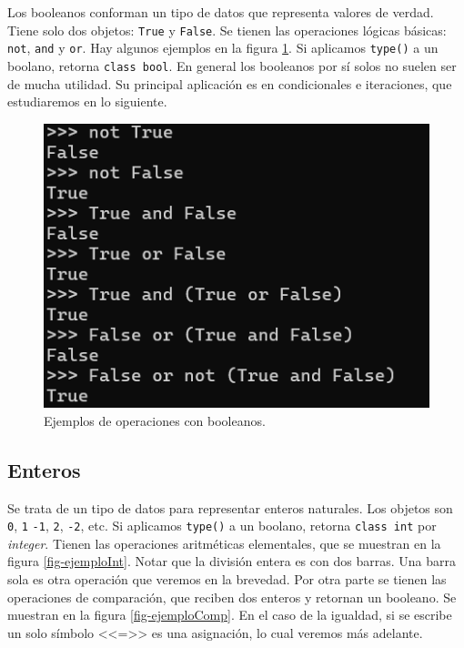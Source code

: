 \documentclass[a4paper, 12pt]{report}
\theoremstyle{definition}
\begin{document}
Los booleanos conforman un tipo de datos que representa valores de verdad. Tiene solo dos objetos: {\tt True} y {\tt False}. Se tienen las operaciones lógicas básicas: {\tt not}, {\tt and} y {\tt or}. Hay algunos ejemplos en la figura \ref{fig-ejemploBool}. Si aplicamos {\tt type()} a un boolano, retorna {\tt class bool}. En general los booleanos por sí solos no suelen ser de mucha utilidad. Su principal aplicación es en condicionales e iteraciones, que estudiaremos en lo siguiente. 

\begin{figure}
	\centering
	\includegraphics[scale=0.6]{ejemploBool.png}
	\caption{Ejemplos de operaciones con booleanos.}
	\label{fig-ejemploBool}
\end{figure}

\subsection{Enteros}

Se trata de un tipo de datos para representar enteros naturales. Los objetos son {\tt 0}, {\tt 1} {\tt -1}, {\tt 2}, {\tt -2}, etc. Si aplicamos {\tt type()} a un boolano, retorna {\tt class int} por {\sl integer}. Tienen las operaciones aritméticas elementales, que se muestran en la figura \ref{fig-ejemploInt}. Notar que la división entera es con dos barras. Una barra sola es otra operación que veremos en la brevedad. Por otra parte se tienen las operaciones de comparación, que reciben dos enteros y retornan un booleano. Se muestran en la figura \ref{fig-ejemploComp}. En el caso de la igualdad, si se escribe un solo símbolo <<=>> es una asignación, lo cual veremos más adelante.
\end{document}
